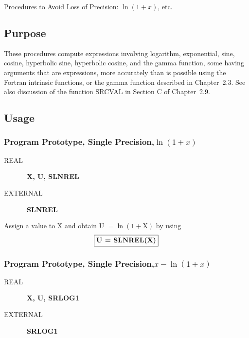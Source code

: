 \documentclass[twoside]{MATH77}
\begin{document}
  Procedures to Avoid Loss of Precision: $\ln (1+x)$, etc.


\subsection{Purpose}

These procedures compute expressions involving logarithm, exponential, sine,
cosine, hyperbolic sine, hyperbolic cosine, and the gamma function, some
having arguments that are expressions, more accurately than is possible
using the Fortran intrinsic functions, or the gamma function described in
Chapter~2.3. See also discussion of the function SRCVAL in Section C
of Chapter~2.9.

\subsection{Usage}

\subsubsection{Program Prototype, Single Precision,\newline  $\ln (1+x)$}

\begin{description}

\item[REAL] \ {\bf  X, U, SLNREL}

\item[EXTERNAL] \ {\bf  SLNREL}

\end{description}

Assign a value to X and obtain U $= \ln (1+\text{X})$ by using
$$
\fbox{\bf U = SLNREL(X)}
$$
\subsubsection{Program Prototype, Single Precision,\newline $x - \ln (1+x)$}

\begin{description}

\item[REAL] \ {\bf  X, U, SRLOG1}

\item[EXTERNAL] \ {\bf  SRLOG1}

\end{description}
\end{document}
